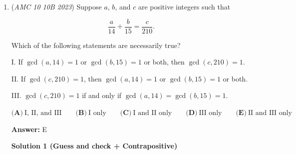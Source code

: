 \begin{enumerate}
Same formal process of Solution 2, once we have $4x^3 - 13x^2 + 11x - 2$. Let $s_{2} = a^2 + b^2 + c^2$ and $s_{1} = a + b + c = \frac{13}{4}$. Applying \href{https://artofproblemsolving.com/wiki/index.php/Newton's\_Sums}{Newton's Sums}, we have 
 \[(4)s_{2} + (-13)s_{1} + 2 * 11 = 0\]. We can solve that $s_{2} = \frac{81}{16}$, and the interior diagonal would be 
 \[\sqrt{s_{2}} = \frac{9}{4}\].

 



\textbf{Solution 4 (Cheese Method)}

Incorporating the solution above, we know $a+b+c$ = $13/4$ $\Rightarrow$ $a+b+c > 3$. The side lengths are larger than $1$ $\cdot$ $1$ $\cdot$ $1$ (a unit cube). The side length of the interior of a unit cube is $\sqrt{3}$, and we know that the side lengths are larger than $1$ $\cdot$ $1$ $\cdot$ $1$, so that means the diagonal has to be larger than $\sqrt{3}$, and the only answer choice larger than $\sqrt{3}$ $\Rightarrow$ $\boxed{\textbf{(D)}~\frac94}$

 Note that the real number $\sqrt{3}$ is around $1.73$. Option $A$ is also greater than $\sqrt{3}$ meaning there are two options greater than $\sqrt{3}$. Option $A$ is an integer so educationally guessing we arrive at answer $D$ $\Rightarrow$ $\boxed{\textbf{(D)}~\frac94}$



	\item (\textit{AMC 10 10B 2023}) Suppose $a$, $b$, and $c$ are positive integers such that

 \[\dfrac{a}{14}+\dfrac{b}{15}=\dfrac{c}{210}.\]


 Which of the following statements are necessarily true?


 I. If $\gcd(a,14)=1$ or $\gcd(b,15)=1$ or both, then $\gcd(c,210)=1$.


 II. If $\gcd(c,210)=1$, then $\gcd(a,14)=1$ or $\gcd(b,15)=1$ or both.


 III. $\gcd(c,210)=1$ if and only if $\gcd(a,14)=\gcd(b,15)=1$.


 \(\textbf{(A)}~\text{I, II, and III}\qquad\textbf{(B)}~\text{I only}\qquad\textbf{(C)}~\text{I and II only}\qquad\textbf{(D)}~\text{III only}\qquad\textbf{(E)}~\text{II and III only}\)


 
 \textbf{Answer: }E



\textbf{Solution 1 (Guess and check + Contrapositive)}


\end{enumerate}
